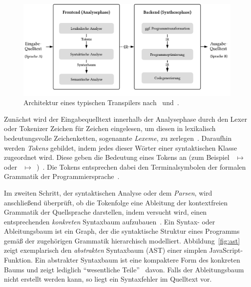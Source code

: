 \bigbreak
\begin{figure}[htb]
  \includegraphics[width=\textwidth]{src/2_Grundlagen/fig/transpiler-architecture.pdf}
  \caption{Architektur eines typischen Transpilers nach~\autocite{EVGENIY:2016} und~\autocite[8]{TORCZON:2007}.}
	\label{fig:transpiler-architecture}
\end{figure}

Zunächst wird der Eingabequelltext innerhalb der Analysephase durch den Lexer oder Tokenizer Zeichen für Zeichen eingelesen, um diesen in lexikalisch bedeutungsvolle Zeichenketten, sogenannte \emph{Lexeme}, zu zerlegen~\autocite[43]{AHO:COMPILERS}. Daraufhin werden \emph{Tokens} gebildet, indem jedes dieser Wörter einer syntaktischen Klasse zugeordnet wird. Diese geben die Bedeutung eines Tokens an (zum Beispiel ~$\mapsto$~ oder \code{!=}~$\mapsto$~)~\autocite[26]{TORCZON:2007}. Die Tokens entsprechen dabei den Terminalsymbolen der formalen Grammatik der Programmiersprache~\autocite[43]{AHO:COMPILERS}.

Im zweiten Schritt, der syntaktischen Analyse oder dem \emph{Parsen}, wird anschließend überprüft, ob die Tokenfolge eine Ableitung der kontextfreien Grammatik der Quellsprache darstellen, indem versucht wird, einen entsprechenden \emph{konkreten} Syntaxbaum aufzubauen~\autocite{SCHOEPP:COMPILER}. Ein Syntax- oder Ableitungsbaum ist ein Graph, der die syntaktische Struktur eines Programms gemäß der zugehörigen Grammatik hierarchisch modelliert. Abbildung~\ref{fig:ast} zeigt exemplarisch den \emph{abstrakten} Syntaxbaum (AST) einer simplen JavaScript-Funktion. Ein abstrakter Syntaxbaum ist eine kompaktere Form des konkreten Baums und zeigt lediglich \enquote{wesentliche Teile}~\autocite[21]{WALDMANN:PPS} davon. Falls der Ableitungsbaum nicht erstellt werden kann, so liegt ein Syntaxfehler im Quelltext vor.

